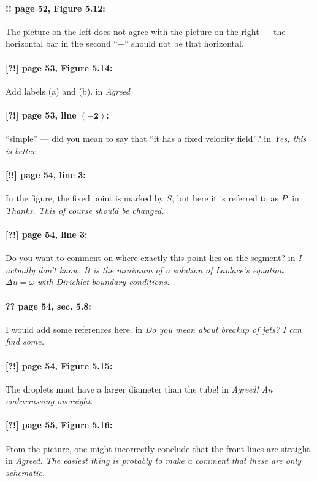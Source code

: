 \documentclass[twoside]{article}
\begin{document}
\paragraph{!! page 52, Figure 5.12:} The picture on the left does not agree with the picture on the right — the horizontal bar in the second “+” should not be that horizontal.

\paragraph{[?!] page 53, Figure 5.14:}
Add labels (a) and (b).
 in {\it  Agreed} 

\paragraph{[?!] page 53, line $\bm{(-2)}$:} “simple” — did you mean to say that “it has a fixed velocity field”?
 in {\it  Yes,  this is better.} 

\paragraph{[!!] page 54, line 3:} In the figure, the fixed point is marked by $S$, but here it is referred to as $P$.
 in {\it  Thanks. This of course should be changed.} 

\paragraph{[?!] page 54, line 3:} Do you want to comment on where exactly this point lies on the segment?
 in {\it  I actually don't know. It is the minimum of a solution of Laplace's equation $ \Delta u = \omega $ with Dirichlet boundary conditions.} 

\paragraph{?? page 54, sec. 5.8:} I would add some references here.
 in {\it  Do you mean about breakup of jets? I can find some. } 

\paragraph{[?!] page 54, Figure 5.15:}
The droplets must have a larger diameter than the tube!
 in {\it  Agreed! An embarrassing oversight.} 

\paragraph{[?!] page 55, Figure 5.16:}
From the picture, one might incorrectly conclude that the front lines are straight.
 in {\it  Agreed. The easiest thing is probably to make a comment that these are only schematic. } 
\end{document}

